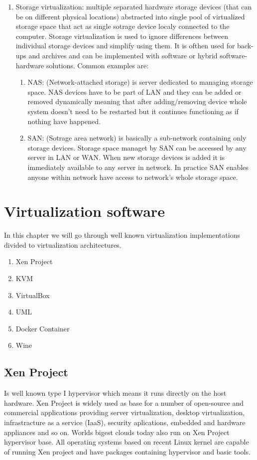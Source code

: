 \begin{enumerate}
\begin{enumerate}
\item Storage virtualization: multiple separated hardware storage devices (that can be on different physical locations) abstracted into single pool of virtualized storage space that act as single sotrage device localy connected to the computer. Storage virtualization is used to ignore differences between individual storage devices and simplify using them. It is ofthen used for back-ups and archives and can be implemented with software or hybrid software-hardware solutions. Common examples are:
\begin{enumerate}
\item NAS: (Network-attached storage) is server dedicated to managing storage space. NAS devices have to be part of LAN and they can be added or removed dynamically meaning that after adding/removing device whole system doesn't need to be restarted but it continues functioning as if nothing have happened.
\item SAN: (Sotrage area network) is basically a sub-network containing only storage devices. Storage space managet by SAN can be accessed by any server in LAN or WAN. When new storage devices is added it is immediately available to any server in network. In practice SAN enables anyone within network have access to network's whole storage space.
\end{enumerate}
\end{enumerate}
\end{enumerate}


\chapter{Virtualization software}
In this chapter we will go through well known virtualization implementations divided to virtualization architectures.
\begin{enumerate}
\item Xen Project
\item KVM
\item VirtualBox
\item UML
\item Docker Container
\item Wine
\end{enumerate}

\section{Xen Project}
Is well known type I hypervisor which means it runs directly on the host hardware. Xen Project is widely used as base for a number of open-source and commercial applications providing server virtualization, desktop virtualization, infrastracture as a service (IaaS), security aplications, embedded and hardware appliances and so on. Worlds bigest clouds today also run on Xen Project hypervisor base. All operating systems based on recent Linux kernel are capable of running Xen project and have packages containing hypervisor and basic tools.

